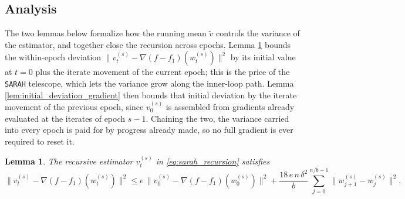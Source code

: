 \documentclass{article}
\newtheorem{lemma}{Lemma}
\begin{document}

\subsection{Analysis}

The two lemmas below formalize how the running mean $\tilde v$ controls the variance of the estimator, and together close the recursion across epochs. Lemma \ref{lem:deviation_gradient} bounds the within-epoch deviation $\|v_t^{(s)} - \nabla(f - f_1)(w_t^{(s)})\|^2$ by its initial value at $t = 0$ plus the iterate movement of the current epoch; this is the price of the \texttt{SARAH} telescope, which lets the variance grow along the inner-loop path. Lemma \ref{lem:initial_deviation_gradient} then bounds that initial deviation by the iterate movement of the previous epoch, since $v_0^{(s)}$ is assembled from gradients already evaluated at the iterates of epoch $s-1$. Chaining the two, the variance carried into every epoch is paid for by progress already made, so no full gradient is ever required to reset it.

\begin{lemma}%
\label{lem:deviation_gradient}
The recursive estimator $v_t^{(s)}$ in \ref{eq:sarah_recursion} 
satisfies
\[ 
    \|v_t^{(s)} - \nabla(f - f_1)(w_t^{(s)})\|^2 
    \leq e\,\|v_0^{(s)} - \nabla(f - f_1)(w_0^{(s)})\|^2 
    + \frac{18\,e\,n\,\delta^2}{b}\sum_{j=0}^{n/b - 1}
    \|w_{j+1}^{(s)} - w_j^{(s)}\|^2.
\]
\end{lemma}
\end{document}
